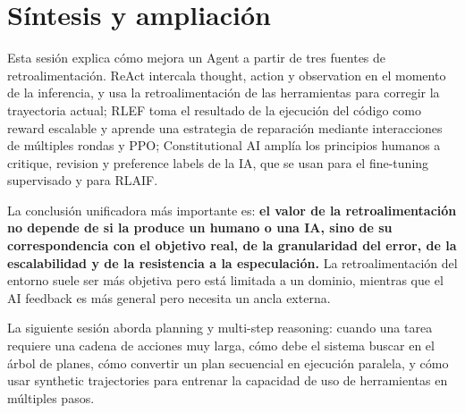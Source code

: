 \section{Síntesis y ampliación}

Esta sesión explica cómo mejora un Agent a partir de tres fuentes de retroalimentación. ReAct intercala thought, action y observation en el momento de la inferencia, y usa la retroalimentación de las herramientas para corregir la trayectoria actual; RLEF toma el resultado de la ejecución del código como reward escalable y aprende una estrategia de reparación mediante interacciones de múltiples rondas y PPO; Constitutional AI amplía los principios humanos a critique, revision y preference labels de la IA, que se usan para el fine-tuning supervisado y para RLAIF.

La conclusión unificadora más importante es: \textbf{el valor de la retroalimentación no depende de si la produce un humano o una IA, sino de su correspondencia con el objetivo real, de la granularidad del error, de la escalabilidad y de la resistencia a la especulación.} La retroalimentación del entorno suele ser más objetiva pero está limitada a un dominio, mientras que el AI feedback es más general pero necesita un ancla externa.

La siguiente sesión aborda planning y multi-step reasoning: cuando una tarea requiere una cadena de acciones muy larga, cómo debe el sistema buscar en el árbol de planes, cómo convertir un plan secuencial en ejecución paralela, y cómo usar synthetic trajectories para entrenar la capacidad de uso de herramientas en múltiples pasos.


